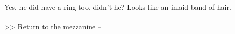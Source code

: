 Yes, he did have a ring too, didn’t he? Looks like an inlaid band of hair.\\
\\

>> Return to the mezzanine -- 